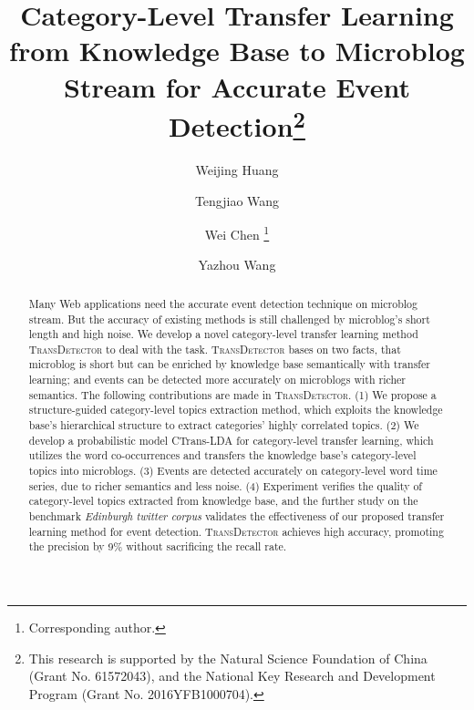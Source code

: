 \documentclass[runningheads,a4paper]{llncs}
\theoremstyle{exampstyle}
\begin{document}
%
\title{Category-Level Transfer Learning from Knowledge Base to Microblog Stream for Accurate Event Detection\thanks{This research is supported by the Natural Science Foundation of China (Grant No. 61572043), and the National Key Research and Development Program (Grant No. 2016YFB1000704).}}
\author{Weijing Huang \and Tengjiao Wang \and Wei Chen \thanks{Corresponding author.} \and Yazhou Wang }

\maketitle
\thispagestyle{empty}
\pagestyle{empty}
%


\begin{abstract}
Many Web applications need the accurate event detection technique on microblog stream. 
But the accuracy of existing methods is still challenged by microblog's short length and high noise. 
We develop a novel category-level transfer learning method \textsc{TransDetector} to deal with the task.  
\textsc{TransDetector} bases on two facts, that microblog is short but can be enriched by knowledge base semantically with transfer learning; and events can be detected more accurately on microblogs with richer semantics.
The following contributions are made in \textsc{TransDetector}.
(1) We propose a structure-guided category-level topics extraction method, which exploits the knowledge base's hierarchical structure to extract categories' highly correlated topics. 
(2) We develop a probabilistic model CTrans-LDA for category-level transfer learning, which utilizes the word co-occurrences and transfers the knowledge base's category-level topics into microblogs. 
(3) Events are detected accurately on category-level word time series, due to richer semantics and less noise. 
(4) Experiment verifies the quality of category-level topics extracted from knowledge base, and the further study on the benchmark \textit{Edinburgh twitter corpus} validates the effectiveness of our proposed transfer learning method for event detection.
\textsc{TransDetector} achieves high accuracy, promoting the precision by 9\% without  sacrificing the recall rate.
\end{abstract}
\end{document}
